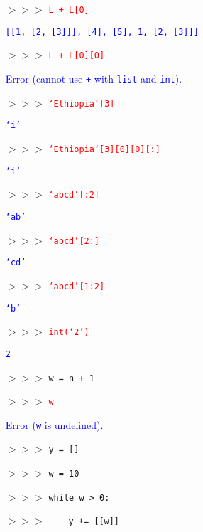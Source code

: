 \documentclass[11pt]{article}
\newcommand{\ans}[1]{\textcolor{red}{#1}}
\newcommand{\sol}[1]{\textcolor{blue}{#1}}
\begin{document}
\begin{itemize}
\item[$>>>$]\ans{\texttt{L + L[0]}}
\item[] \sol{\texttt{[[1, [2, [3]]], [4], [5], 1, [2, [3]]]}}
\item[$>>>$]\ans{\texttt{L + L[0][0]}}
\item[] \sol{Error (cannot use \texttt{+} with \texttt{list} and \texttt{int}).}
\item[$>>>$]\ans{\texttt{`Ethiopia'[3]}}
\item[] \sol{\texttt{`i'}}
\item[$>>>$]\ans{\texttt{`Ethiopia'[3][0][0][:]}}
\item[] \sol{\texttt{`i'}}
\item[$>>>$]\ans{\texttt{`abcd'[:2]}}
\item[] \sol{\texttt{`ab'}}
\item[$>>>$]\ans{\texttt{`abcd'[2:]}}
\item[] \sol{\texttt{`cd'}}
\item[$>>>$]\ans{\texttt{`abcd'[1:2]}}
\item[] \sol{\texttt{`b'}}
\item[$>>>$]\ans{\texttt{int(`2')}}
\item[] \sol{\texttt{2}}
\item[$>>>$] \texttt{w = n + 1}
\item[$>>>$] \ans{\texttt{w}}
\item[] \sol{Error (\texttt{w} is undefined).}
\item[$>>>$] \texttt{y = []}
\item[$>>>$] \texttt{w = 10}
\item[$>>>$] \texttt{while w > 0:}
\item[$>>>$] \ \ \ \ \texttt{y += [[w]]}
\end{itemize}
\end{document}
